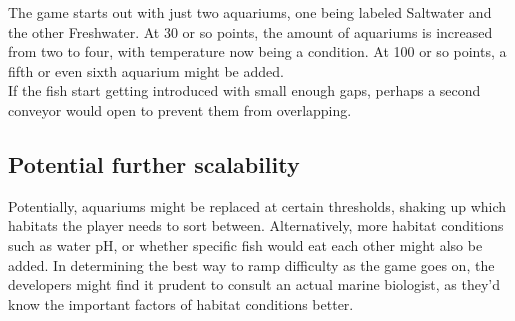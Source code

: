 \documentclass[12pt, a4paper]{article}
\begin{document}
The game starts out with just two aquariums, one being labeled Saltwater and the other Freshwater. At 30 or so points, the amount of aquariums is increased from two to four, with temperature now being a condition. At 100 or so points, a fifth or even sixth aquarium might be added.\\

If the fish start getting introduced with small enough gaps, perhaps a second conveyor would open to prevent them from overlapping.\\

\subsection{Potential further scalability}
Potentially, aquariums might be replaced at certain thresholds, shaking up which habitats the player needs to sort between. Alternatively, more habitat conditions such as water pH, or whether specific fish would eat each other might also be added. In determining the best way to ramp difficulty as the game goes on, the developers might find it prudent to consult an actual marine biologist, as they'd know the important factors of habitat conditions better.
\end{document}
